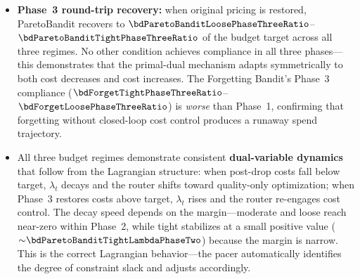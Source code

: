 \begin{itemize}[nosep,leftmargin=*]
    while automatically exploiting the Gemini price
    drop to improve quality
    ($\Delta_\mathrm{reward}{=}+\bdParetoBanditLooseRewardLift$ to
    $+\bdParetoBanditTightRewardLift$).
  \item \textbf{Phase~3 round-trip recovery:} when original pricing
    is restored, ParetoBandit recovers to
    $\bdParetoBanditLoosePhaseThreeRatio$--$\bdParetoBanditTightPhaseThreeRatio$
    of the budget target across all three regimes.  No other
    condition achieves compliance in all three phases---this
    demonstrates that the primal-dual mechanism adapts symmetrically
    to both cost decreases and cost increases.
    The Forgetting Bandit's Phase~3 compliance
    ($\bdForgetTightPhaseThreeRatio$--$\bdForgetLoosePhaseThreeRatio$)
    is \emph{worse} than Phase~1, confirming that forgetting
    without closed-loop cost control produces a runaway spend
    trajectory.
  \item All three budget regimes demonstrate consistent
    \textbf{dual-variable dynamics} that follow from the Lagrangian
    structure: when post-drop costs fall below target, $\lambda_t$
    decays and the router shifts toward quality-only optimization;
    when Phase~3 restores costs above target, $\lambda_t$ rises
    and the router re-engages cost control.
    The decay speed depends on the margin---moderate and loose
    reach near-zero within Phase~2, while tight stabilizes at a
    small positive value
    (${\sim}\bdParetoBanditTightLambdaPhaseTwo$) because the margin
    is narrow.
    This is the correct Lagrangian behavior---the pacer
    automatically identifies the degree of constraint slack
    and adjusts accordingly.
\end{itemize}
